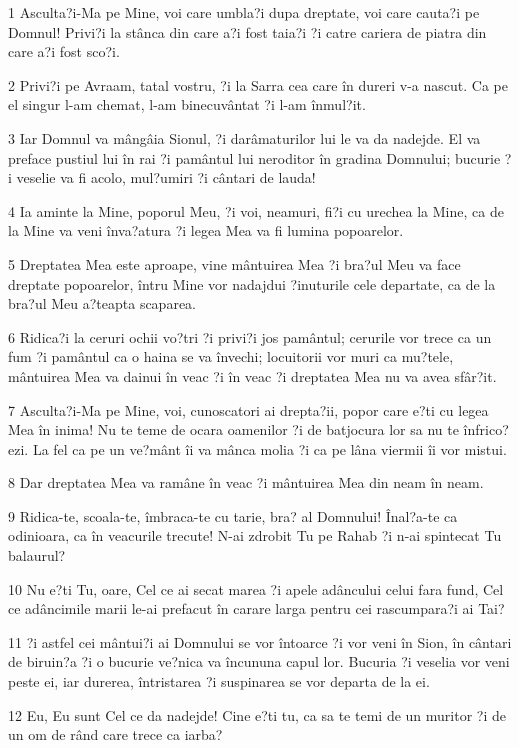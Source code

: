 \par 1 Asculta?i-Ma pe Mine, voi care umbla?i dupa dreptate, voi care cauta?i pe Domnul! Privi?i la stânca din care a?i fost taia?i ?i catre cariera de piatra din care a?i fost sco?i.
\par 2 Privi?i pe Avraam, tatal vostru, ?i la Sarra cea care în dureri v-a nascut. Ca pe el singur l-am chemat, l-am binecuvântat ?i l-am înmul?it.
\par 3 Iar Domnul va mângâia Sionul, ?i darâmaturilor lui le va da nadejde. El va preface pustiul lui în rai ?i pamântul lui neroditor în gradina Domnului; bucurie ?i veselie va fi acolo, mul?umiri ?i cântari de lauda!
\par 4 Ia aminte la Mine, poporul Meu, ?i voi, neamuri, fi?i cu urechea la Mine, ca de la Mine va veni înva?atura ?i legea Mea va fi lumina popoarelor.
\par 5 Dreptatea Mea este aproape, vine mântuirea Mea ?i bra?ul Meu va face dreptate popoarelor, întru Mine vor nadajdui ?inuturile cele departate, ca de la bra?ul Meu a?teapta scaparea.
\par 6 Ridica?i la ceruri ochii vo?tri ?i privi?i jos pamântul; cerurile vor trece ca un fum ?i pamântul ca o haina se va învechi; locuitorii vor muri ca mu?tele, mântuirea Mea va dainui în veac ?i în veac ?i dreptatea Mea nu va avea sfâr?it.
\par 7 Asculta?i-Ma pe Mine, voi, cunoscatori ai drepta?ii, popor care e?ti cu legea Mea în inima! Nu te teme de ocara oamenilor ?i de batjocura lor sa nu te înfrico?ezi. La fel ca pe un ve?mânt îi va mânca molia ?i ca pe lâna viermii îi vor mistui.
\par 8 Dar dreptatea Mea va ramâne în veac ?i mântuirea Mea din neam în neam.
\par 9 Ridica-te, scoala-te, îmbraca-te cu tarie, bra? al Domnului! Înal?a-te ca odinioara, ca în veacurile trecute! N-ai zdrobit Tu pe Rahab ?i n-ai spintecat Tu balaurul?
\par 10 Nu e?ti Tu, oare, Cel ce ai secat marea ?i apele adâncului celui fara fund, Cel ce adâncimile marii le-ai prefacut în carare larga pentru cei rascumpara?i ai Tai?
\par 11 ?i astfel cei mântui?i ai Domnului se vor întoarce ?i vor veni în Sion, în cântari de biruin?a ?i o bucurie ve?nica va încununa capul lor. Bucuria ?i veselia vor veni peste ei, iar durerea, întristarea ?i suspinarea se vor departa de la ei.
\par 12 Eu, Eu sunt Cel ce da nadejde! Cine e?ti tu, ca sa te temi de un muritor ?i de un om de rând care trece ca iarba?
